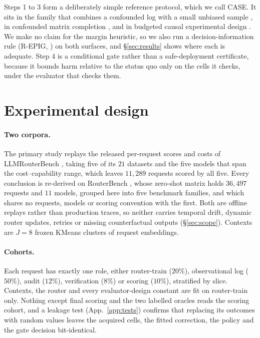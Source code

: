 \documentclass{article}
\theoremstyle{plain}
\theoremstyle{remark}
\begin{document}
Steps 1 to 3 form a deliberately simple reference protocol, which we call CASE. It sits in the family
that combines a confounded log with a small unbiased sample
\citep{athey2020combining,kallus2018removing,rosenman2022propensity}, in confounded matrix completion
\citep{agarwal2023causalmc}, and in budgeted causal experimental design
\citep{gao2026budgeted,gao2025causalepig}. We make no claim for
the margin heuristic, so we also run a decision-information rule (R-EPIG,
\citealp{gao2026observationally}) on both surfaces, and \S\ref{sec:results} shows where each is
adequate. Step 4 is a conditional gate rather than a safe-deployment certificate, because it bounds
harm relative to the status quo only on the cells it checks, under the evaluator that checks them.

\section{Experimental design}\label{sec:design}
\paragraph{Two corpora.} The primary study replays the released per-request scores and costs of
LLMRouterBench \citep{li2026llmrouterbench}, taking five of its $21$ datasets and the five models
that span the cost--capability range, which leaves $11{,}289$ requests scored by all five. Every
conclusion is re-derived on RouterBench \citep{hu2024routerbench}, whose zero-shot matrix holds
$36{,}497$ requests and $11$ models, grouped here into five benchmark families, and which shares no
requests, models or scoring convention with the first. Both are offline replays rather than production traces, so neither carries temporal drift,
dynamic router updates, retries or missing counterfactual outputs (\S\ref{sec:scope}). Contexts are
$J{=}8$ frozen KMeans clusters of request embeddings.

\paragraph{Cohorts.} Each request has exactly one role, either router-train ($20\%$), observational
log ($50\%$), audit ($12\%$), verification ($8\%$) or scoring ($10\%$), stratified by slice. Contexts,
the router and every evaluator-design constant are fit on router-train only. Nothing except final
scoring and the two labelled oracles reads the scoring cohort, and a leakage test
(App.~\ref{app:tests}) confirms that replacing its outcomes with random values leaves the acquired
cells, the fitted correction, the policy and the gate decision bit-identical.
\end{document}
